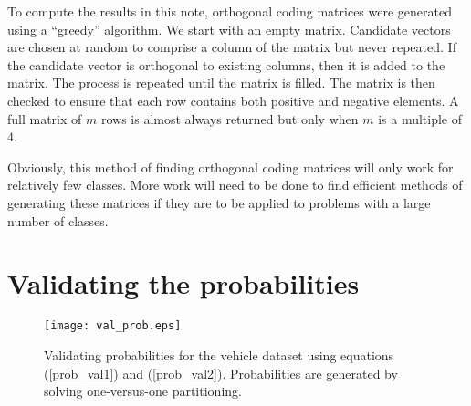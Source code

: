 To compute the results in this note, orthogonal coding matrices were generated
using a ``greedy'' algorithm.
We start with an empty matrix.
Candidate vectors are chosen at random to comprise a column of the matrix
but never repeated.
If the candidate vector is orthogonal to existing columns, then it is added to the matrix.
The process is repeated until the matrix is filled.
The matrix is then checked to ensure that each row contains both positive and
negative elements.
A full matrix of $m$ rows is almost always returned but only when $m$
is a multiple of $4$.

Obviously, this method of finding orthogonal coding matrices
will only work for relatively few classes.
More work will need to be done to find efficient methods
of generating these matrices
if they are to be applied to problems with a large number of classes.

\section{Validating the probabilities}

\begin{figure}
	\texttt{[image: val\_prob.eps]}
	\caption{Validating probabilities for the vehicle dataset
		using equations	(\ref{prob_val1}) and (\ref{prob_val2}).
		Probabilities are generated by solving one-versus-one 
		partitioning.}\label{val_prob}
\end{figure}


